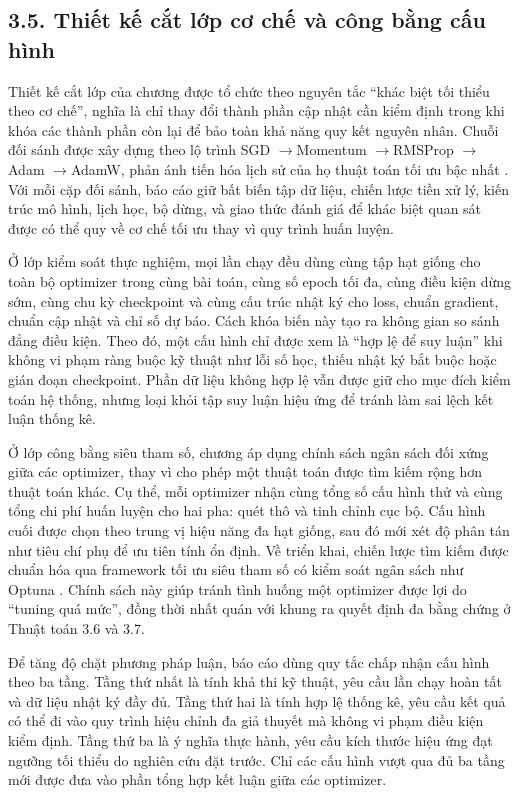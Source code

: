 \documentclass[a4paper,12pt]{article}
\newcommand{\flow}{\ensuremath{\rightarrow}}
\begin{document}
\subsection{3.5. Thiết kế cắt lớp cơ chế và công bằng cấu hình}

Thiết kế cắt lớp của chương được tổ chức theo nguyên tắc “khác biệt tối thiểu theo cơ chế”, nghĩa là chỉ thay đổi thành phần cập nhật cần kiểm định trong khi khóa các thành phần còn lại để bảo toàn khả năng quy kết nguyên nhân. Chuỗi đối sánh được xây dựng theo lộ trình SGD \flow Momentum \flow RMSProp \flow Adam \flow AdamW, phản ánh tiến hóa lịch sử của họ thuật toán tối ưu bậc nhất \cite{ref1,ref2,ref3,ref4,ref5}. Với mỗi cặp đối sánh, báo cáo giữ bất biến tập dữ liệu, chiến lược tiền xử lý, kiến trúc mô hình, lịch học, bộ dừng, và giao thức đánh giá để khác biệt quan sát được có thể quy về cơ chế tối ưu thay vì quy trình huấn luyện.

Ở lớp kiểm soát thực nghiệm, mọi lần chạy đều dùng cùng tập hạt giống cho toàn bộ optimizer trong cùng bài toán, cùng số epoch tối đa, cùng điều kiện dừng sớm, cùng chu kỳ checkpoint và cùng cấu trúc nhật ký cho loss, chuẩn gradient, chuẩn cập nhật và chỉ số dự báo. Cách khóa biến này tạo ra không gian so sánh đẳng điều kiện. Theo đó, một cấu hình chỉ được xem là “hợp lệ để suy luận” khi không vi phạm ràng buộc kỹ thuật như lỗi số học, thiếu nhật ký bắt buộc hoặc gián đoạn checkpoint. Phần dữ liệu không hợp lệ vẫn được giữ cho mục đích kiểm toán hệ thống, nhưng loại khỏi tập suy luận hiệu ứng để tránh làm sai lệch kết luận thống kê.

Ở lớp công bằng siêu tham số, chương áp dụng chính sách ngân sách đối xứng giữa các optimizer, thay vì cho phép một thuật toán được tìm kiếm rộng hơn thuật toán khác. Cụ thể, mỗi optimizer nhận cùng tổng số cấu hình thử và cùng tổng chi phí huấn luyện cho hai pha: quét thô và tinh chỉnh cục bộ. Cấu hình cuối được chọn theo trung vị hiệu năng đa hạt giống, sau đó mới xét độ phân tán như tiêu chí phụ để ưu tiên tính ổn định. Về triển khai, chiến lược tìm kiếm được chuẩn hóa qua framework tối ưu siêu tham số có kiểm soát ngân sách như Optuna \cite{ref17}. Chính sách này giúp tránh tình huống một optimizer được lợi do “tuning quá mức”, đồng thời nhất quán với khung ra quyết định đa bằng chứng ở Thuật toán 3.6 và 3.7.

Để tăng độ chặt phương pháp luận, báo cáo dùng quy tắc chấp nhận cấu hình theo ba tầng. Tầng thứ nhất là tính khả thi kỹ thuật, yêu cầu lần chạy hoàn tất và dữ liệu nhật ký đầy đủ. Tầng thứ hai là tính hợp lệ thống kê, yêu cầu kết quả có thể đi vào quy trình hiệu chỉnh đa giả thuyết mà không vi phạm điều kiện kiểm định. Tầng thứ ba là ý nghĩa thực hành, yêu cầu kích thước hiệu ứng đạt ngưỡng tối thiểu do nghiên cứu đặt trước. Chỉ các cấu hình vượt qua đủ ba tầng mới được đưa vào phần tổng hợp kết luận giữa các optimizer.
\end{document}
